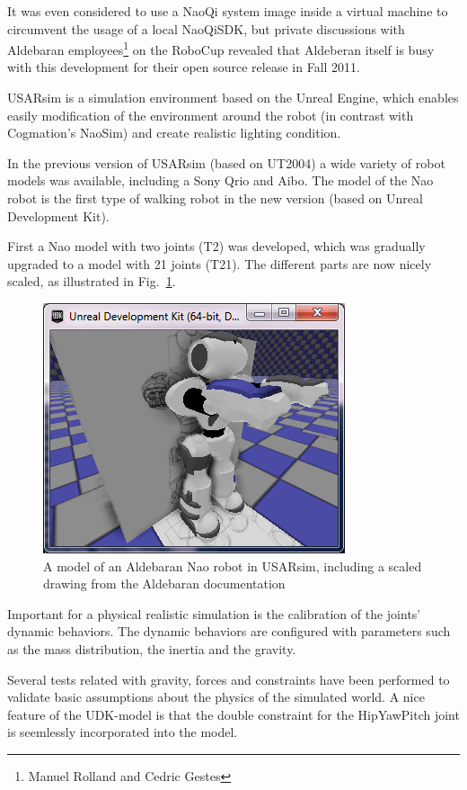\documentclass[11pt,a4paper,oneside]{article}
\begin{document}
It was even considered to use a NaoQi system image inside a virtual machine to circumvent the usage of a local NaoQiSDK, but private discussions with Aldebaran employees\footnote{Manuel Rolland and Cedric Gestes} on the RoboCup revealed that Aldeberan itself is busy with this development for their open source release in Fall 2011. 

USARsim is a simulation environment based on the Unreal Engine, which enables easily modification of the environment around the robot (in contrast with Cogmation's NaoSim) and create realistic lighting condition.  

In the previous version of USARsim (based on UT2004) a wide variety of robot models was available, including a Sony Qrio and Aibo. The model of the Nao robot is the first type of walking robot in the new version (based on Unreal Development Kit).  

First a Nao model with two joints (T2) was developed, which was gradually upgraded to a model with 21 joints (T21). The different parts are now nicely scaled, as illustrated in Fig.~\ref{fig:nao_scaled}.

\begin{figure}[hbt]        
\centering\includegraphics[width=.5\columnwidth]{nao33_correctheight.png}
\caption{A model of an Aldebaran Nao robot in USARsim, including a scaled drawing from the Aldebaran documentation}\label{fig:nao_scaled}
\end{figure}

Important for a physical realistic simulation is the calibration of the joints' dynamic behaviors. The dynamic behaviors are configured with parameters such as the mass distribution, the inertia and the gravity. 

Several tests related with gravity, forces and constraints have been performed to validate basic assumptions about the physics of the simulated world. A nice feature of the UDK-model is that the double constraint for the HipYawPitch joint is seemlessly incorporated into the model.
\end{document}
